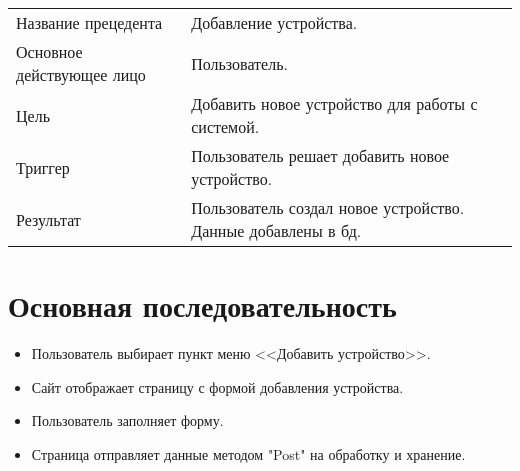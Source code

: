 \begin{table}[]
    \begin{tabular}{ll}
    Название прецедента       & Добавление устройства.\\
    Основное действующее лицо & Пользователь.\\
    Цель                      & Добавить новое устройство для работы с системой.\\
    Триггер                   & Пользователь решает добавить новое устройство.\\
    Результат                 & Пользователь создал новое устройство. Данные добавлены в бд.
    \end{tabular}
\end{table}

\section{Основная последовательность}
\begin{itemize}
    \item Пользователь выбирает пункт меню <<Добавить устройство>>.
    \item Сайт отображает страницу с формой добавления устройства.
    \item Пользователь заполняет форму.
    \item Страница отправляет данные методом "Post" на обработку и хранение. 
\end{itemize}